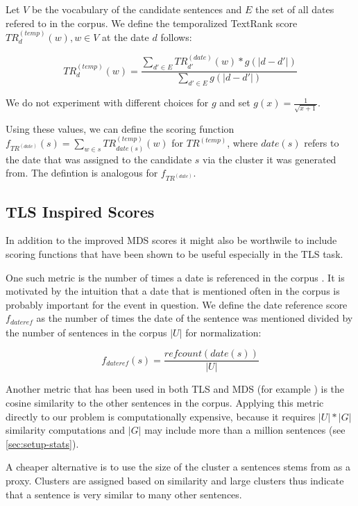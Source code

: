 \documentclass[a4paper,BCOR=10mm]{report}
\numberwithin{lemma}{chapter}
\numberwithin{definition}{chapter}
\begin{document}
Let $V$ be the vocabulary of the candidate sentences and $E$ the set of all dates refered to in the corpus. We define the temporalized TextRank score $TR^{(temp)}_d(w), w \in V$ at the date $d$ follows:

\begin{equation}
    TR^{(temp)}_d(w) = \frac{\sum_{d' \in E} TR^{(date)}_{d'}(w) * g(|d - d'|)}{\sum_{d' \in E} g(|d - d'|)}
\end{equation}

We do not experiment with different choices for $g$ and set $g(x) = \frac{1}{\sqrt{x + 1}}$.

Using these values, we can define the scoring function $f_{TR^{(date)}}(s) = \sum_{w \in s} TR^{(temp)}_{\mathit{date}(s)}(w)$ for $TR^{(temp)}$, where $\mathit{date}(s)$ refers to the date that was assigned to the candidate $s$ via the cluster it was generated from.
The defintion is analogous for $f_{TR^{(date)}}$.

\subsection{TLS Inspired Scores} \label{sec:tls-scores}

In addition to the improved MDS scores it might also be worthwile to include scoring functions that have been shown to be useful especially in the TLS task.

One such metric is the number of times a date is referenced in the corpus \citep{markert, datesel-graph}. It is motivated by the intuition that a date that is mentioned often in the corpus is probably important for the event in question. We define the date reference score $f_{\mathit{dateref}}$ as the number of times the date of the sentence was mentioned divided by the number of sentences in the corpus $|U|$ for normalization:

\begin{equation}
f_{\mathit{dateref}}(s) = \frac{\mathit{refcount}(\mathit{date}(s))}{|U|}
\end{equation}

Another metric that has been used in both TLS \citep{chieu} and MDS (for example \citet{lexrank}) is the cosine similarity to the other sentences in the corpus.
Applying this metric directly to our problem is computationally expensive, because it requires $|U| * |G|$ similarity computations and $|G|$ may include more than a million sentences (see \ref{sec:setup-stats}).

A cheaper alternative is to use the size of the cluster a sentences stems from as a proxy. Clusters are assigned based on similarity and large clusters thus indicate that a sentence is very similar to many other sentences.
\end{document}
